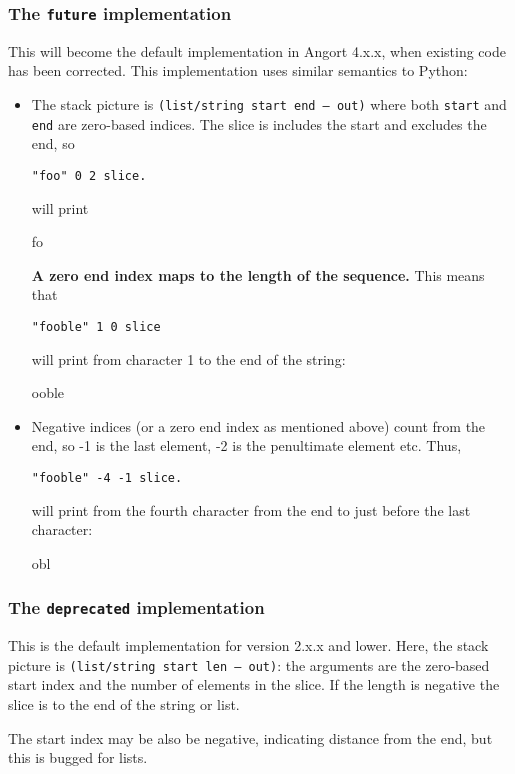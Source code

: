 \subsubsection{The \texttt{future} implementation}
This will become the default implementation in Angort 4.x.x, when
existing code has been corrected. This implementation uses similar
semantics to Python:
\begin{itemize}
\item The stack picture is \texttt{(list/string start end -- out)} where both \texttt{start} and \texttt{end} 
are zero-based indices. The slice is includes the start and excludes the end,
so 
\begin{lstlisting}
"foo" 0 2 slice.
\end{lstlisting}
will print
\begin{v}
fo
\end{v}
\textbf{A zero end index maps to the length of the sequence.} This means that
\begin{lstlisting}
"fooble" 1 0 slice
\end{lstlisting}
will print from character 1 to the end of the string:
\begin{v}
ooble
\end{v}

\item Negative indices (or a zero end index as mentioned above) count from the end, so -1 is the last element, -2
is the penultimate element etc. Thus, 
\begin{lstlisting}
"fooble" -4 -1 slice.
\end{lstlisting}
will print from the fourth character from the end to just before the last character:
\begin{v}
obl
\end{v}
\end{itemize}
    




\subsubsection{The \texttt{deprecated} implementation}
This is the default implementation for version 2.x.x and lower.
Here, the stack picture is \texttt{(list/string start len -- out)}: the arguments
are the zero-based start index and the number of elements in the slice.
If the length is negative the slice is to the end of the string or list.

The start index may be also be negative, indicating distance from the
end, but this is bugged for lists.



